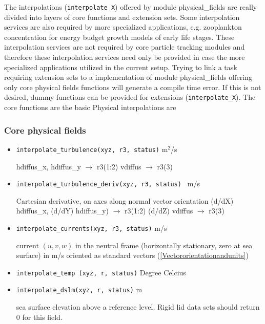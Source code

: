 The interpolations ({\tt interpolate\_X}) offered by module physical\_fields
are really divided into layers of core functions and extension sets. 
Some interpolation services are also required by more specialized applications,
e.g. zooplankton concentration for energy budget growth models of early 
life stages. These interpolation services are not required by core particle tracking
modules and therefore these interpolation services need only be provided in
case the more specialized applications utilized in the current setup. Trying to 
link a task requiring extension sets to a implementation of module physical\_fields
offering only core physical fields functions will generate a compile time error.
If this is not desired, dummy functions can be provided for extensions ({\tt interpolate\_X}).
The core functions are the basic Physical interpolations are 

\subsubsection{Core physical fields}
\begin{itemize}
  \item {\tt interpolate\_turbulence(xyz, r3, status)}  m$^2$/s  \newline 
              
        hdiffus\_x, hdiffus\_y $\rightarrow$ r3(1:2)  \newline
        vdiffus                $\rightarrow$ r3(3)  \newline
         
  \item {\tt interpolate\_turbulence\_deriv(xyz, r3, status) } m/s      \newline

        Cartesian derivative, on axes along normal vector orientation \newline
        (d/dX) hdiffus\_x, (d/dY) hdiffus\_y) $\rightarrow$ r3(1:2)  \newline
        (d/dZ) vdiffus          $\rightarrow$ r3(3)  \newline
  
  \item {\tt interpolate\_currents(xyz, r3, status)} m/s \newline
                   
    current $(u,v,w)$ in the neutral frame (horizontally stationary, zero at sea surface)
    in m/s oriented as standard vectors (\ref{Vectororientationandunits}) 
           
  \item {\tt interpolate\_temp (xyz, r, status)} Degree Celcius   \newline       

  \item {\tt interpolate\_dslm(xyz, r, status)}  m                \newline

    sea surface elevation above a reference level. Rigid lid
    data sets should return 0 for this field. 
 
\end{itemize}

